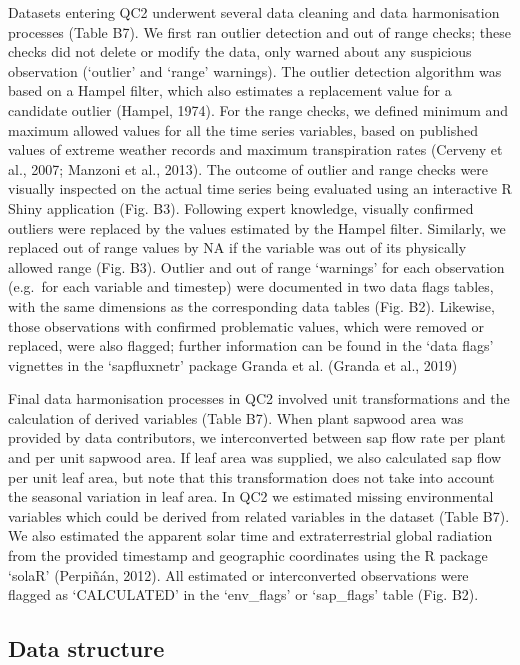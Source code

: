 \documentclass[11pt,twoside]{reedthesis}
\begin{document}
Datasets entering QC2 underwent several data cleaning and data
harmonisation processes (Table B7). We first ran outlier detection and
out of range checks; these checks did not delete or modify the data,
only warned about any suspicious observation (`outlier' and `range'
warnings). The outlier detection algorithm was based on a Hampel filter,
which also estimates a replacement value for a candidate outlier
(Hampel, 1974). For the range checks, we defined minimum and maximum
allowed values for all the time series variables, based on published
values of extreme weather records and maximum transpiration rates
(Cerveny et al., 2007; Manzoni et al., 2013). The outcome of outlier and
range checks were visually inspected on the actual time series being
evaluated using an interactive R Shiny application (Fig. B3). Following
expert knowledge, visually confirmed outliers were replaced by the
values estimated by the Hampel filter. Similarly, we replaced out of
range values by NA if the variable was out of its physically allowed
range (Fig. B3). Outlier and out of range `warnings' for each
observation (e.g.~for each variable and timestep) were documented in two
data flags tables, with the same dimensions as the corresponding data
tables (Fig. B2). Likewise, those observations with confirmed
problematic values, which were removed or replaced, were also flagged;
further information can be found in the `data flags' vignettes in the
`sapfluxnetr' package Granda et al. (Granda et al., 2019)\par

Final data harmonisation processes in QC2 involved unit transformations
and the calculation of derived variables (Table B7). When plant sapwood
area was provided by data contributors, we interconverted between sap
flow rate per plant and per unit sapwood area. If leaf area was
supplied, we also calculated sap flow per unit leaf area, but note that
this transformation does not take into account the seasonal variation in
leaf area. In QC2 we estimated missing environmental variables which
could be derived from related variables in the dataset (Table B7). We
also estimated the apparent solar time and extraterrestrial global
radiation from the provided timestamp and geographic coordinates using
the R package `solaR' (Perpiñán, 2012). All estimated or interconverted
observations were flagged as `CALCULATED' in the `env\_flags' or
`sap\_flags' table (Fig. B2).\par

\subsection{Data structure}\label{data-structure}
\end{document}
